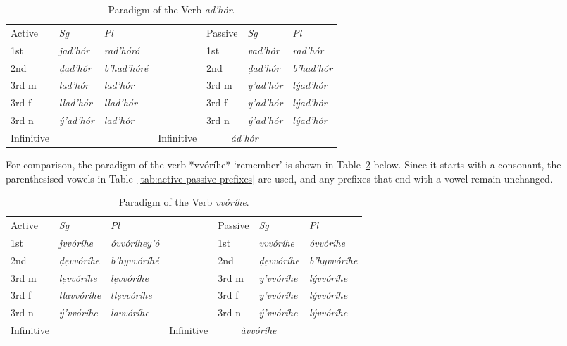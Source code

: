 \documentclass[a4paper, 12pt, oneside, final]{article}
\let \nf \normalfont
\def \d {ḍ}
\begin{document}
\begin{table}[H]
\centering
\noindent\begin{tabular}{@{}|>{}l|>{\it}l|>{\it}l|>{}l|>{}l|>{\it}l|>{\it}l|}\cline{1-3}\cline{5-7}
\nf Active&\nf Sg&\nf Pl&\nf &\nf Passive&\nf Sg&\nf Pl\\\cline{1-3}\cline{5-7}
1st&jad’hór&rad’hóró&&1st&vad’hór&rad’hór\\\cline{1-3}\cline{5-7}
2nd&\d{}ad’hór&b’had’hóré&&2nd&\d{}ad’hór&b’had’hór\\\cline{1-3}\cline{5-7}
3rd m&lad’hór&lad’hór&&3rd m&y’ad’hór&lýad’hór\\\cline{1-3}\cline{5-7}
3rd f&llad’hór&llad’hór&&3rd f&y’ad’hór &lýad’hór\\\cline{1-3}\cline{5-7}
3rd n&ý’ad’hór&lad’hór&&3rd n&ý’ad’hór&lýad’hór\\\cline{1-3}\cline{5-7}
Infinitive&\multicolumn{2}{c|}{\it dad’hór}&&Infinitive&\multicolumn{2}{c|}{\it ád’hór}\\\cline{1-3}\cline{5-7}
\end{tabular}
\caption{Paradigm of the Verb \emph{ad’hór}.}\label{tab:adhor-paradigm}
\end{table}

\noindent For comparison, the paradigm of the verb *vvóríhe* ‘remember’ is shown in Table~\ref{tab:vvorihe-paradigm} below.
Since it starts with a consonant, the parenthesised vowels in Table~\ref{tab:active-passive-prefixes} are used, and any
prefixes that end with a vowel remain unchanged.

\begin{table}[H]
\centering
\noindent\begin{tabular}{@{}|>{}l|>{\it}l|>{\it}l|>{}l|>{}l|>{\it}l|>{\it}l|}\cline{1-3}\cline{5-7}
\nf Active&\nf Sg&\nf Pl&\nf &\nf Passive&\nf Sg&\nf Pl\\\cline{1-3}\cline{5-7}
1st&jvvóríhe&óvvóríhey’ó&&1st&vvvóríhe&óvvóríhe\\\cline{1-3}\cline{5-7}
2nd&ḍẹvvóríhe&b’hyvvóríhé&&2nd&ḍẹvvóríhe&b’hyvvóríhe\\\cline{1-3}\cline{5-7}
3rd m&lẹvvóríhe&lẹvvóríhe&&3rd m&y’vvóríhe&lývvóríhe\\\cline{1-3}\cline{5-7}
3rd f&llavvóríhe&llẹvvóríhe&&3rd f&y’vvóríhe&lývvóríhe\\\cline{1-3}\cline{5-7}
3rd n&ý’vvóríhe&lavvóríhe&&3rd n&ý’vvóríhe&lývvóríhe\\\cline{1-3}\cline{5-7}
Infinitive&\multicolumn{2}{c|}{\it dẹvvóríhe}&&Infinitive&\multicolumn{2}{c|}{\it àvvóríhe}\\\cline{1-3}\cline{5-7}
\end{tabular}
\caption{Paradigm of the Verb \emph{vvóríhe}.}\label{tab:vvorihe-paradigm}
\end{table}
\end{document}
